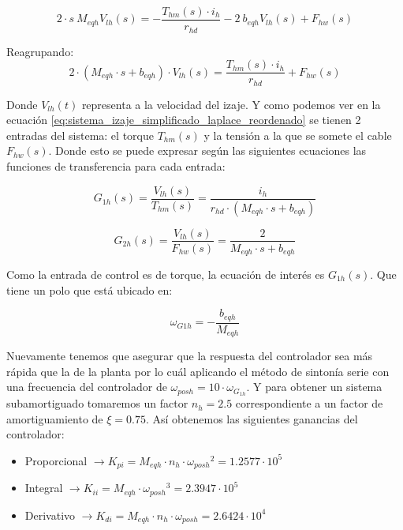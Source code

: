 \documentclass[11pt]{article}
\begin{document}
\begin{equation}
	\label{eq:sistema_izaje_simplificado_laplace}
	2\cdot s\ M_{eqh} V_{lh}(s)=-\frac{ T_{hm}(s)\cdot i_{h}}{r_{hd}}-2\ b_{eqh} V_{lh}(s)+F_{hw}(s)
\end{equation}

Reagrupando:
\begin{equation}
	\label{eq:sistema_izaje_simplificado_laplace_reordenado}
	2\cdot \left ( M_{eqh}\cdot s+b_{eqh} \right )\cdot V_{lh}(s) = \frac{T_{hm}(s)\cdot i_{h}}{r_{hd}}+ F_{hw}(s)
\end{equation}

Donde $V_{lh}(t)$ representa a la velocidad del izaje. Y como podemos ver en la ecuación \ref{eq:sistema_izaje_simplificado_laplace_reordenado} se tienen 2 entradas del sistema: el torque $T_{hm}(s)$ y la tensión a la que se somete el cable $F_{hw}(s)$. Donde esto se puede expresar según las siguientes ecuaciones las funciones de transferencia para cada entrada:

\begin{equation}
	\label{eq:sistema_izaje_simplificado_laplace_G1h}
	G_{1h}(s)=\frac{V_{lh}(s)}{T_{hm}(s)}=\frac{i_{h}}{r_{hd}\cdot (M_{eqh}\cdot s+b_{eqh})}
\end{equation}

\begin{equation}
	\label{eq:sistema_izaje_simplificado_laplace_G2h}
	G_{2h}(s)=\frac{V_{lh}(s)}{F_{hw}(s)}=\frac{2}{M_{eqh}\cdot s+b_{eqh}}
\end{equation}

Como la entrada de control es de torque, la ecuación de interés es $G_{1h}(s)$. Que tiene un polo que está ubicado en:

\begin{equation}
	\label{eq:sistema_izaje_simplificado_laplace_polos}
	\omega_{G1h}=-\frac{b_{eqh}}{M_{eqh}}
\end{equation}

Nuevamente tenemos que asegurar que la respuesta del controlador sea más rápida que la de la planta por lo cuál aplicando el método de sintonía serie con una frecuencia del controlador de $\omega_{posh}=10\cdot \omega_{G_{1h}}$. Y para obtener un sistema subamortiguado tomaremos un factor $n_{h}=2.5$ correspondiente a un factor de amortiguamiento de $\xi =0.75$. Así obtenemos las siguientes ganancias del controlador:

\begin{itemize}
	\item Proporcional $\rightarrow K_{pi} = M_{eqh}\cdot n_{h}\cdot {\omega_{posh}}^{2} = 1.2577 \cdot 10^5$
	\item Integral $\rightarrow K_{ii} = M_{eqh}\cdot {\omega_{posh}}^{3}  = 2.3947 \cdot 10^5$
	\item Derivativo $\rightarrow K_{di} = M_{eqh}\cdot n_{h}\cdot {\omega_{posh}} = 2.6424\cdot 10^4$
\end{itemize}
\end{document}
